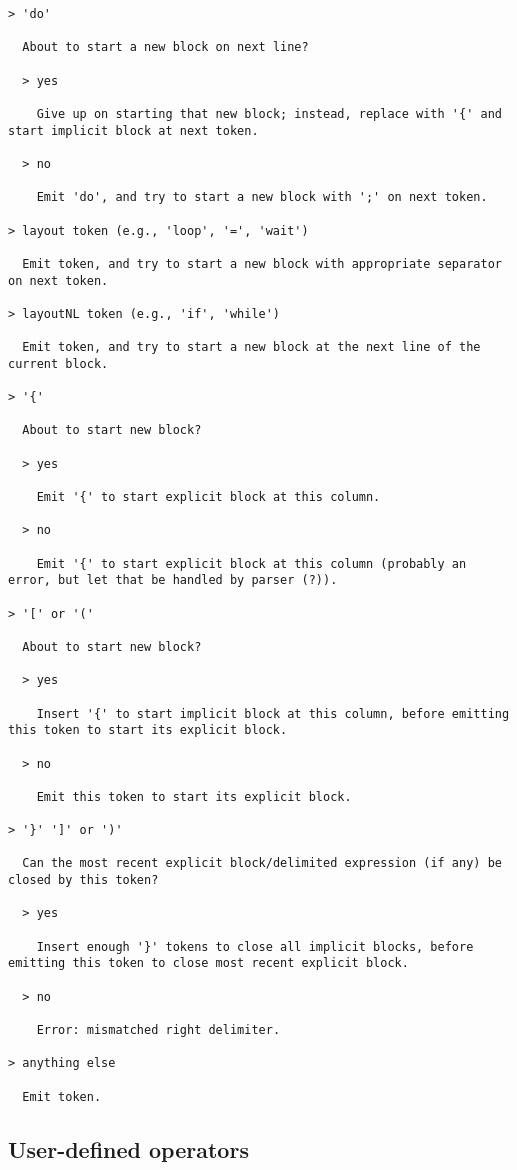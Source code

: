 \documentclass{article}
\begin{document}
\begin{lstlisting}
> 'do'

  About to start a new block on next line?

  > yes

    Give up on starting that new block; instead, replace with '{' and start implicit block at next token.

  > no

    Emit 'do', and try to start a new block with ';' on next token.

> layout token (e.g., 'loop', '=', 'wait')

  Emit token, and try to start a new block with appropriate separator on next token.

> layoutNL token (e.g., 'if', 'while')

  Emit token, and try to start a new block at the next line of the current block.

> '{'

  About to start new block?

  > yes

    Emit '{' to start explicit block at this column.

  > no

    Emit '{' to start explicit block at this column (probably an error, but let that be handled by parser (?)).

> '[' or '('

  About to start new block?

  > yes

    Insert '{' to start implicit block at this column, before emitting this token to start its explicit block.

  > no

    Emit this token to start its explicit block.

> '}' ']' or ')'

  Can the most recent explicit block/delimited expression (if any) be closed by this token?

  > yes

    Insert enough '}' tokens to close all implicit blocks, before emitting this token to close most recent explicit block.

  > no

    Error: mismatched right delimiter.

> anything else

  Emit token.

\end{lstlisting}

\subsection{User-defined operators}
\end{document}
